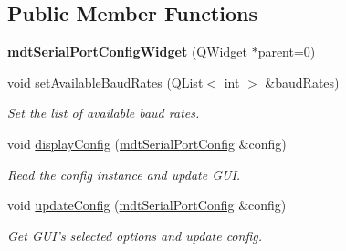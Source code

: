 \subsection*{Public Member Functions}
\begin{DoxyCompactItemize}
\item 
\hypertarget{classmdt_serial_port_config_widget_a7c6dc14693263f011e0725d45040b0f3}{
{\bfseries mdtSerialPortConfigWidget} (QWidget $\ast$parent=0)}
\label{classmdt_serial_port_config_widget_a7c6dc14693263f011e0725d45040b0f3}

\item 
\hypertarget{classmdt_serial_port_config_widget_a5113611573e0e8cc0fd030e887e17c86}{
void \hyperlink{classmdt_serial_port_config_widget_a5113611573e0e8cc0fd030e887e17c86}{setAvailableBaudRates} (QList$<$ int $>$ \&baudRates)}
\label{classmdt_serial_port_config_widget_a5113611573e0e8cc0fd030e887e17c86}

\begin{DoxyCompactList}\small\item\em Set the list of available baud rates. \end{DoxyCompactList}\item 
\hypertarget{classmdt_serial_port_config_widget_a3cc8a728e224b656510896f31047fb73}{
void \hyperlink{classmdt_serial_port_config_widget_a3cc8a728e224b656510896f31047fb73}{displayConfig} (\hyperlink{classmdt_serial_port_config}{mdtSerialPortConfig} \&config)}
\label{classmdt_serial_port_config_widget_a3cc8a728e224b656510896f31047fb73}

\begin{DoxyCompactList}\small\item\em Read the config instance and update GUI. \end{DoxyCompactList}\item 
void \hyperlink{classmdt_serial_port_config_widget_aebc1fba656f51f9910a466add7987fcf}{updateConfig} (\hyperlink{classmdt_serial_port_config}{mdtSerialPortConfig} \&config)
\begin{DoxyCompactList}\small\item\em Get GUI's selected options and update config. \end{DoxyCompactList}\end{DoxyCompactItemize}


